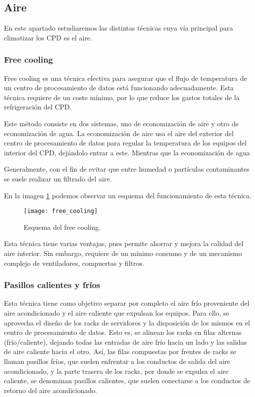 \subsection{Aire}

En este apartado estudiaremos las distintas técnicas cuya vía principal para climatizar los CPD es el aire.

\subsubsection{Free cooling}

Free cooling es una técnica efectiva para asegurar que el flujo de temperatura de un centro de procesamiento de datos está funcionando adecuadamente. Esta técnica requiere de un coste mínimo, por lo que reduce los gastos totales de la refrigeración del CPD.

Este método consiste en dos sistemas, uno de economización de aire y otro de economización de agua. La economización de aire usa el aire del exterior del centro de procesamiento de datos para regular la temperatura de los equipos del interior del CPD, dejándolo entrar a este. Mientras que la economización de agua %


Generalmente, con el fin de evitar que entre humedad o partículas contaminantes se suele realizar un filtrado del aire.

En la imagen \ref{free_coling} podemos observar un esquema del funcionamiento de esta técnica.

\begin{figure}
    \begin{center}
    \caption{Esquema del free cooling.}
    \label{free_coling}
    \texttt{[image: free\_cooling]}
    \end{center}
\end{figure}

Esta técnica tiene varias ventajas, pues permite ahorrar y mejora la calidad del aire interior. Sin embargo, requiere de un mínimo consumo y de un mecanismo complejo de ventiladores, compuertas y filtros.

\subsubsection{Pasillos calientes y fríos}

Esta técnica tiene como objetivo separar por completo el aire frío proveniente del aire acondicionado y el aire caliente que expulsan los equipos. Para ello, se aprovecha el diseño de los racks de servidores y la disposición de los mismos en el centro de procesamiento de datos. Esto es, se alinean los racks en filas alternas (frío/caliente), dejando todas las entradas de aire frío hacia un lado y las salidas de aire caliente hacia el otro. Así, las filas compuestas por frentes de racks se llaman pasillos fríos, que suelen enfrentar a los conductos de salida del aire acondicionado, y la parte trasera de los racks, por donde se expulsa el aire caliente, se denominan pasillos calientes, que suelen conectarse a los conductos de retorno del aire acondicionado.

